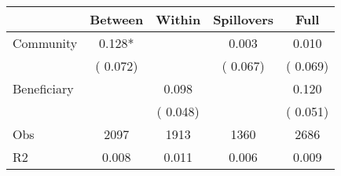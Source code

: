
\begin{tabular}{l*{4}{c}}\hline&\multicolumn{1}{c}{Between}&\multicolumn{1}{c}{Within}&\multicolumn{1}{c}{Spillovers}&\multicolumn{1}{c}{Full}\\ \hline
 Community             &              0.128*      &                                               &        0.003 &         0.010                            \\ 
                               &        (       0.072)           &                                       &       (       0.067)     &      (       0.069)                                           \\ 
 Beneficiary   &                                               &        0.098    &                                &             0.120                            \\ 
                               &                                               & (       0.048)                  &                                        &      (       0.051)                                           \\ 
\hline                                                                                                                                                                                                                                            
 Obs                   &               2097               &       1913                       &       1360                &              2686                                               \\ 
 R2                    &                      0.008              &              0.011                      &              0.006               &                     0.009                                              \\ 
\hline \end{tabular}                                                                                                                                                                                                              